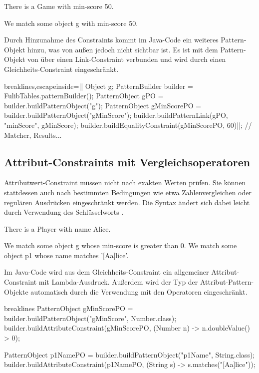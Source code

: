 \begin{mdcodeblock}
    There is a Game with min-score 50.

    We match some object g with min-score 50.
\end{mdcodeblock}

Durch Hinzunahme des Constraints kommt im Java-Code ein weiteres Pattern-Objekt hinzu, was von außen jedoch nicht sichtbar ist.
Es ist mit dem Pattern-Objekt von  über einen Link-Constraint verbunden und wird durch einen Gleichheits-Constraint eingeschränkt.

\begin{jcodeblock*}{breaklines,escapeinside=||}
    Object g;
    {
        PatternBuilder builder = FulibTables.patternBuilder();
        PatternObject gPO = builder.buildPatternObject("g");
        PatternObject gMinScorePO = builder.buildPatternObject("gMinScore");
        builder.buildPatternLink(gPO, "minScore", gMinScore);
        builder.buildEqualityConstraint(gMinScorePO, 60)|\footnotemark|;
        // Matcher, Results...
    }
\end{jcodeblock*}

\subsection{Attribut-Constraints mit Vergleichsoperatoren}

Attributwert-Constraint müssen nicht nach exakten Werten prüfen.
Sie können stattdessen auch nach bestimmten Bedingungen wie etwa Zahlenvergleichen oder regulären Ausdrücken eingeschränkt werden.
Die Syntax ändert sich dabei leicht durch Verwendung des Schlüsselworts .

\begin{mdcodeblock}
    There is a Player with name Alice.

    We match some object g whose min-score is greater than 0.
    We match some object p1 whose name matches '[Aa]lice'.
\end{mdcodeblock}

Im Java-Code wird aus dem Gleichheits-Constraint ein allgemeiner Attribut-Constraint mit Lambda-Ausdruck.
Außerdem wird der Typ der Attribut-Pattern-Objekte automatisch durch die Verwendung mit den Operatoren eingeschränkt.

\begin{jcodeblock*}{breaklines}
    PatternObject gMinScorePO = builder.buildPatternObject("gMinScore", Number.class);
    builder.buildAttributeConstraint(gMinScorePO, (Number n) -> n.doubleValue() > 0);

    PatternObject p1NamePO = builder.buildPatternObject("p1Name", String.class);
    builder.buildAttributeConstraint(p1NamePO, (String s) -> s.matches("[Aa]lice"));
\end{jcodeblock*}

